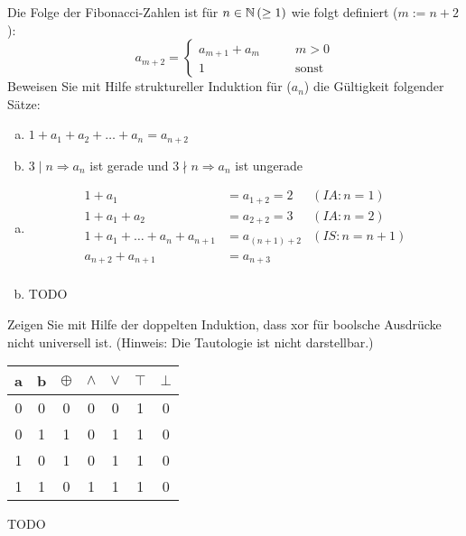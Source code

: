 \begin{card}
  Die Folge der Fibonacci-Zahlen ist für $n \in \mathbb{N} \, (\geq 1)$ wie folgt definiert ($m := n+2$):
  \[
    a_{m+2} =
\begin{cases}
  a_{m+1} + a_{m} & \qquad m > 0 \\
  1 & \qquad \text{sonst}
\end{cases}
  \]
  Beweisen Sie mit Hilfe struktureller Induktion für ($a_n$) die Gültigkeit folgender Sätze:
  \begin{enumerate}[a)]
    \item $1 + a_1 + a_2 + \ldots + a_n = a_{n+2}$
    \item $3 \mid n \Rightarrow a_{n}$ ist gerade und $3 \nmid n \Rightarrow a_{n}$ ist ungerade
	\end{enumerate}
	\hr
  \begin{enumerate}[a)]
	  \item
	    \begin{align*}
        1+a_1 &= a_{1+2} = 2 & (IA: n=1) \\
        1+a_1+a_2 &= a_{2+2} = 3 & (IA: n=2) \\
        1 + a_1 + \ldots + a_n + a_{n+1} &= a_{(n+1)+2} & (IS: n=n+1) \\
        a_{n+2} + a_{n+1} &= a_{n+3} \\
	    \end{align*}
	  \item TODO
	\end{enumerate}
\end{card}

\begin{card}
  Zeigen Sie mit Hilfe der doppelten Induktion, dass xor für boolsche Ausdrücke nicht universell ist. (Hinweis: Die
  Tautologie ist nicht darstellbar.)
	\hr
  \begin{tabular}{cc|c|c|c|c|c}
    a & b & $\oplus$ & $\land$ & $\lor$ & $\top$ & $\bot$ \\ \hline
    0 & 0 & 0 & 0 & 0 & 1 & 0 \\
    0 & 1 & 1 & 0 & 1 & 1 & 0 \\
    1 & 0 & 1 & 0 & 1 & 1 & 0 \\
    1 & 1 & 0 & 1 & 1 & 1 & 0 \\
  \end{tabular}
  TODO
\end{card}

